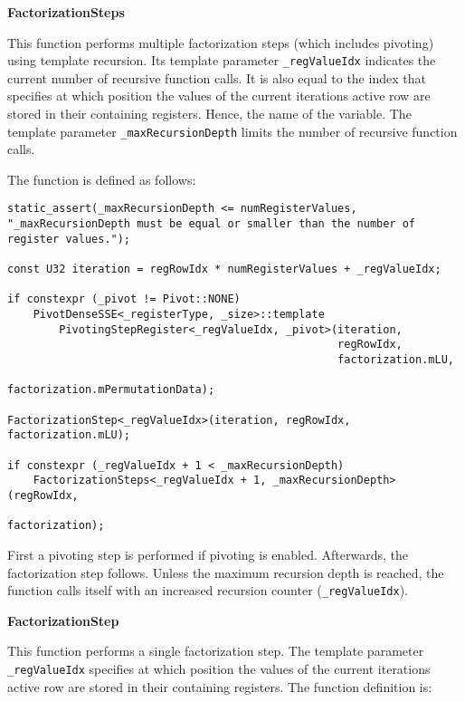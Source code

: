 \vspace{1cm}
\textbf{FactorizationSteps}
\vspace{0.5cm}

This function performs multiple factorization steps (which includes pivoting) using template recursion.
Its template parameter \texttt{_regValueIdx} indicates the current number of recursive function calls.
It is also equal to the index that specifies at which position the values of the current iterations active row are stored in their containing registers.
Hence, the name of the variable.
The template parameter \texttt{_maxRecursionDepth} limits the number of recursive function calls.

The function is defined as follows:

\begin{verbatim}
static_assert(_maxRecursionDepth <= numRegisterValues,
"_maxRecursionDepth must be equal or smaller than the number of register values.");

const U32 iteration = regRowIdx * numRegisterValues + _regValueIdx;

if constexpr (_pivot != Pivot::NONE)
    PivotDenseSSE<_registerType, _size>::template 
        PivotingStepRegister<_regValueIdx, _pivot>(iteration, 
                                                   regRowIdx, 
                                                   factorization.mLU,
                                                   factorization.mPermutationData);

FactorizationStep<_regValueIdx>(iteration, regRowIdx, factorization.mLU);

if constexpr (_regValueIdx + 1 < _maxRecursionDepth)
    FactorizationSteps<_regValueIdx + 1, _maxRecursionDepth>(regRowIdx, 
                                                             factorization);
\end{verbatim}

First a pivoting step is performed if pivoting is enabled.
Afterwards, the factorization step follows.
Unless the maximum recursion depth is reached, the function calls itself with an increased recursion counter (\texttt{_regValueIdx}).




\vspace{1cm}
\textbf{FactorizationStep}
\vspace{0.5cm}

This function performs a single factorization step.
The template parameter \texttt{_regValueIdx} specifies at which position the values of the current iterations active row are stored in their containing registers.
The function definition is:

